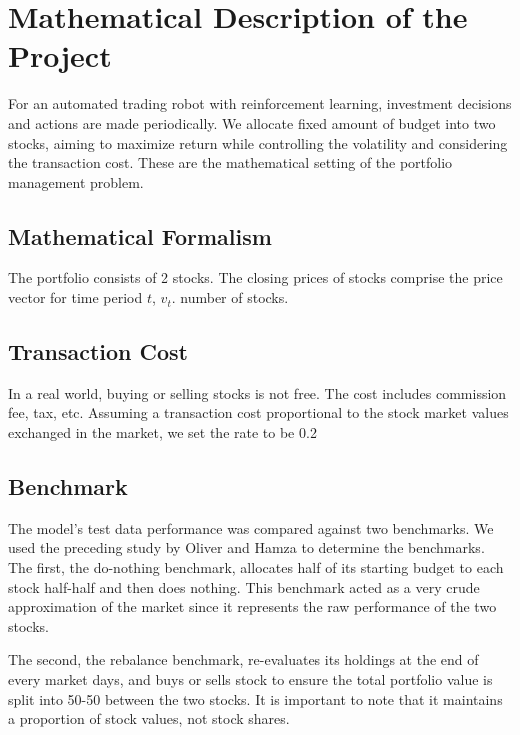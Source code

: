 \chapter{Mathematical Description of the Project}
\label{Ch:mathematical description}
For an automated trading robot with reinforcement learning, investment decisions and actions are made periodically. We allocate fixed amount of budget into two stocks, aiming to maximize return while controlling the volatility and considering the transaction cost. These are the mathematical setting of the portfolio management problem.

\section{Mathematical Formalism}
The portfolio consists of 2 stocks. The closing prices of stocks comprise the price vector for time period $t$, $v_t$. number of stocks.

\section{Transaction Cost}
In a real world, buying or selling stocks is not free. The cost includes commission fee, tax, etc. Assuming a transaction cost proportional to the stock market values exchanged in the market, we set the rate to be 0.2%

\section{Benchmark}
The model’s test data performance was compared against two benchmarks. We used the preceding study by Oliver and Hamza to determine the benchmarks. The first, the do-nothing benchmark, allocates half of its starting budget to each stock half-half and then does nothing. This benchmark acted as a very crude approximation of the market since it represents the raw performance of the two stocks.

The second, the rebalance benchmark, re-evaluates its holdings at the end of every market days, and buys or sells stock to ensure the total portfolio value is split into 50-50 between the two stocks. It is important to note that it maintains a proportion of stock values, not stock shares.
